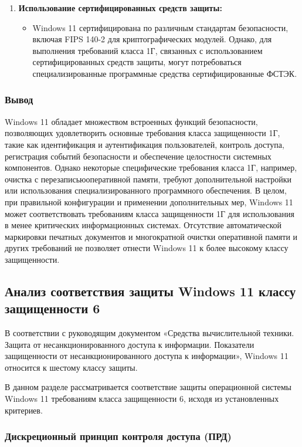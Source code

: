 \documentclass[a4paper, 14pt]{report}
\begin{document}
\begin{enumerate}
\begin{itemize}
          \end{itemize}
    \item \textbf{Использование сертифицированных средств защиты:}
          \begin{itemize}
              \item Windows 11 сертифицирована по различным стандартам безопасности, включая FIPS 140-2 для криптографических модулей. Однако, для выполнения требований класса 1Г, связанных с использованием сертифицированных средств защиты, могут потребоваться специализированные программные средства сертифицированные ФСТЭК.
          \end{itemize}
\end{enumerate}

\subsubsection{Вывод}
Windows 11 обладает множеством встроенных функций безопасности, позволяющих удовлетворить основные требования класса защищенности 1Г,
такие как идентификация и аутентификация пользователей, контроль доступа, регистрация событий безопасности и обеспечение целостности системных компонентов.
Однако некоторые специфические требования класса 1Г, например, очистка с перезаписьюоперативной памяти,
требуют дополнительной настройки или использования специализированного программного обеспечения.
В целом, при правильной конфигурации и применении дополнительных мер, Windows 11 может соответствовать требованиям класса защищенности 1Г
для использования в менее критических информационных системах.
Отсутствие автоматической маркировки печатных документов и многократной очистки оперативной памяти и других требований не позволяет отнести Windows 11 к более высокому классу защищенности.
\subsection{Анализ соответствия защиты Windows 11 классу защищенности 6}
В соответствии с руководящим документом «Средства вычислительной техники. Защита от несанкционированного доступа к информации. Показатели защищенности от несанкционированного доступа к информации», Windows 11 относится к шестому классу защиты.

В данном разделе рассматривается соответствие защиты операционной системы Windows 11 требованиям класса защищенности 6, исходя из установленных критериев.
\subsubsection{Дискреционный принцип контроля доступа (ПРД)}
\end{document}
